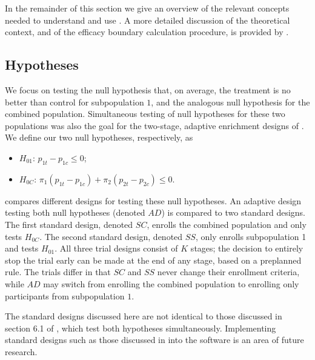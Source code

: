 \documentclass[article]{jss}
\begin{document}
In the remainder of this section we give an overview of the relevant concepts needed to understand and use . A more detailed discussion of the theoretical context, and of the efficacy boundary calculation procedure, is provided by \cite{Rosenblum2013AdaptMISTIE}.
 

\subsection{Hypotheses}
\label{sub:hypotheses}


We focus on testing the null hypothesis that, on average, the treatment is no better than control for subpopulation $1$, and the analogous null hypothesis for the combined population. Simultaneous testing of null hypotheses for these two populations was also the goal for the two-stage, adaptive enrichment designs of \cite{wangetal2007}.
We define our two null hypotheses, respectively, as

\begin{itemize}
\item $H_{01}$: $p_{1t}-p_{1c}≤0$;%
\item $H_{0C}$: $π_1(p_{1t}-p_{1c}) + π_2(p_{2t}-p_{2c}) ≤ 0$. %
\end{itemize}



 compares different designs for testing these null hypotheses. 
An adaptive design testing both null hypotheses (denoted $AD$) is compared to two standard designs. The first standard design, denoted $SC$, enrolls the combined population and only tests $H_{0C}$. The second standard design, denoted $SS$, only enrolls subpopulation 1 and tests $H_{01}$.
All three trial designs consist of $K$ stages; the decision to entirely stop the trial early can be made at the end of any stage, based on a preplanned rule. The trials differ in that $SC$ and $SS$ never change their enrollment criteria, while $AD$ may switch from enrolling the combined population  to enrolling only participants from subpopulation $1$.

The standard designs discussed here are not identical to those discussed in section 6.1 of \citep{Rosenblum2013AdaptMISTIE}, which test both hypotheses simultaneously. Implementing standard designs such as those discussed in \citep{Rosenblum2013AdaptMISTIE} into the  software is an area of future research.
\end{document}
